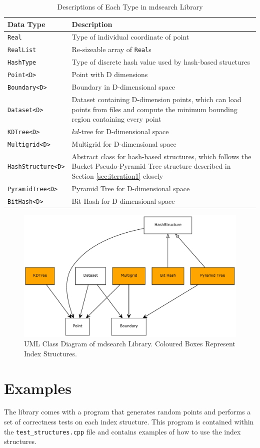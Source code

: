 \begin{table}[h]
	\centering
	\begin{tabular}{|p{4.25cm}|p{9.5cm}|}
		\hline
		\textbf{Data Type} & \textbf{Description} \\
		\hline
		\texttt{Real} & Type of individual coordinate of point \\
		\texttt{RealList} & Re-sizeable array of \texttt{Real}s \\
		\texttt{HashType} & Type of discrete hash value used by hash-based structures \\
		\texttt{Point<D>} & Point with D dimensions \\
		\texttt{Boundary<D>} & Boundary in D-dimensional space \\
		\texttt{Dataset<D>} & Dataset containing D-dimension points, which can load points from files and compute the minimum bounding region containing every point \\
		\texttt{KDTree<D>} & $kd$-tree for D-dimensional space \\
		\texttt{Multigrid<D>} & Multigrid for D-dimensional space \\
		\texttt{HashStructure<D>} & Abstract class for hash-based structures, which follows the Bucket Pseudo-Pyramid Tree structure described in Section \ref{sec:iteration1} closely \\
		\texttt{PyramidTree<D>} & Pyramid Tree for D-dimensional space \\
		\texttt{BitHash<D>} & Bit Hash for D-dimensional space \\
		\hline
	\end{tabular}
	\caption{Descriptions of Each Type in mdsearch Library}
	\label{tab:library-classes}
\end{table}

\begin{figure}[h]
	\centering
	\includegraphics[scale=0.6]{figures/mdsearch_classes_uml.pdf}
	\caption{UML Class Diagram of mdsearch Library. Coloured Boxes Represent Index Structures.}
	\label{fig:library-class-diagram} 
\end{figure}

\section{Examples}

The library comes with a program that generates random points and performs a set of correctness tests on each index structure. This program is contained within the \texttt{test\_structures.cpp} file and contains examples of how to use the index structures.